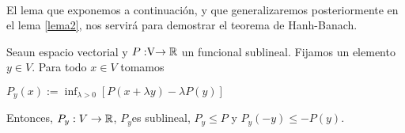 	\paragraph{} El lema que exponemos a continuación, y que generalizaremos posteriormente en el lema \ref{lema2}, nos servirá para demostrar el teorema de Hanh-Banach. 
	
	\begin{lemaBox}\label{lema1}
		Sea\vecSpace un espacio vectorial y $P:\vecSpace \rightarrow \RR$ un funcional sublineal. Fijamos un elemento $ y \in V $. Para todo $ x \in V $ tomamos  
		\begin{center}
			$ P_y(x) := \inf_{\lambda > 0} \left[P(x+\lambda y) - \lambda P(y)\right] $
		\end{center}
		
		Entonces, $ P_y:V \rightarrow \mathbb{R}$, $ P_y $es sublineal, $ P_y \leq P $ y $ P_y (-y) \leq  -P(y)$.
	\end{lemaBox} 
